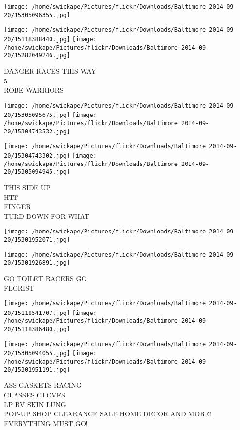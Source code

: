 \documentclass[10pt,letterpaper]{article}
\begin{document}
\texttt{[image: /home/swickape/Pictures/flickr/Downloads/Baltimore 2014-09-20/15305096355.jpg]}

\vspace{0.25in}
\texttt{[image: /home/swickape/Pictures/flickr/Downloads/Baltimore 2014-09-20/15118388440.jpg]}
\texttt{[image: /home/swickape/Pictures/flickr/Downloads/Baltimore 2014-09-20/15282049246.jpg]}

DANGER RACES THIS WAY\\
5\\
ROBE WARRIORS
\pagebreak

\texttt{[image: /home/swickape/Pictures/flickr/Downloads/Baltimore 2014-09-20/15305095675.jpg]}
\texttt{[image: /home/swickape/Pictures/flickr/Downloads/Baltimore 2014-09-20/15304743532.jpg]}

\texttt{[image: /home/swickape/Pictures/flickr/Downloads/Baltimore 2014-09-20/15304743302.jpg]}
\texttt{[image: /home/swickape/Pictures/flickr/Downloads/Baltimore 2014-09-20/15305094945.jpg]}

THIS SIDE UP\\
HTF\\
FINGER\\
TURD DOWN FOR WHAT
\pagebreak

\texttt{[image: /home/swickape/Pictures/flickr/Downloads/Baltimore 2014-09-20/15301952071.jpg]}

\vspace{0.25in}
\texttt{[image: /home/swickape/Pictures/flickr/Downloads/Baltimore 2014-09-20/15301926891.jpg]}

GO TOILET RACERS GO\\
FLORIST
\pagebreak

\texttt{[image: /home/swickape/Pictures/flickr/Downloads/Baltimore 2014-09-20/15118541707.jpg]}
\texttt{[image: /home/swickape/Pictures/flickr/Downloads/Baltimore 2014-09-20/15118386480.jpg]}

\texttt{[image: /home/swickape/Pictures/flickr/Downloads/Baltimore 2014-09-20/15305094055.jpg]}
\texttt{[image: /home/swickape/Pictures/flickr/Downloads/Baltimore 2014-09-20/15301951191.jpg]}

ASS GASKETS RACING\\
GLASSES GLOVES\\
LP BV SKIN LUNG\\
POP{-}UP SHOP CLEARANCE SALE HOME DECOR AND MORE! EVERYTHING MUST GO!
\pagebreak
\end{document}
